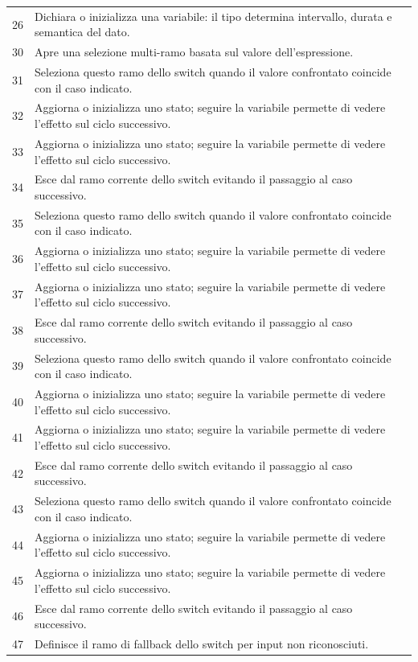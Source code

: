 \documentclass[11pt,a4paper]{article}
\begin{document}
\begin{longtable}{p{}p{}}
26 & Dichiara o inizializza una variabile: il tipo determina intervallo, durata e semantica del dato. \\
30 & Apre una selezione multi-ramo basata sul valore dell'espressione. \\
31 & Seleziona questo ramo dello switch quando il valore confrontato coincide con il caso indicato. \\
32 & Aggiorna o inizializza uno stato; seguire la variabile permette di vedere l'effetto sul ciclo successivo. \\
33 & Aggiorna o inizializza uno stato; seguire la variabile permette di vedere l'effetto sul ciclo successivo. \\
34 & Esce dal ramo corrente dello switch evitando il passaggio al caso successivo. \\
35 & Seleziona questo ramo dello switch quando il valore confrontato coincide con il caso indicato. \\
36 & Aggiorna o inizializza uno stato; seguire la variabile permette di vedere l'effetto sul ciclo successivo. \\
37 & Aggiorna o inizializza uno stato; seguire la variabile permette di vedere l'effetto sul ciclo successivo. \\
38 & Esce dal ramo corrente dello switch evitando il passaggio al caso successivo. \\
39 & Seleziona questo ramo dello switch quando il valore confrontato coincide con il caso indicato. \\
40 & Aggiorna o inizializza uno stato; seguire la variabile permette di vedere l'effetto sul ciclo successivo. \\
41 & Aggiorna o inizializza uno stato; seguire la variabile permette di vedere l'effetto sul ciclo successivo. \\
42 & Esce dal ramo corrente dello switch evitando il passaggio al caso successivo. \\
43 & Seleziona questo ramo dello switch quando il valore confrontato coincide con il caso indicato. \\
44 & Aggiorna o inizializza uno stato; seguire la variabile permette di vedere l'effetto sul ciclo successivo. \\
45 & Aggiorna o inizializza uno stato; seguire la variabile permette di vedere l'effetto sul ciclo successivo. \\
46 & Esce dal ramo corrente dello switch evitando il passaggio al caso successivo. \\
47 & Definisce il ramo di fallback dello switch per input non riconosciuti. \\

\end{longtable}
\end{document}
